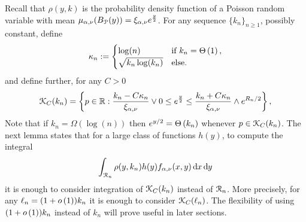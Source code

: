 Recall that $\rho(y, k)$ is the probability density function of a Poisson random variable with mean $\mu_{\alpha, \nu}(B_{{\mathcal P}}(y)) = \xi_{\alpha,\nu}e^{\frac{y}{2}}$. 
For any sequence $\{k_n\}_{n \ge 1}$, possibly constant, define
\begin{equation}\label{eq:def_kappa_n}
	\kappa_n := \begin{cases}
		\log(n) &\mbox{if } k_n = \Theta\left(1\right),\\
		\sqrt{k_n \log(k_n)} &\mbox{else.}
	\end{cases}
\end{equation}
and define further, for any $C > 0$
\begin{equation}\label{eq:def_K_C_set}
	{\mathcal K}_C(k_n) = \left\{p \in {\ensuremath{\mathbb R}} : \frac{k_n - C \kappa_n}{\xi_{\alpha,\nu}} \vee 0 \le e^{\frac{y}{2}}
	\le \frac{k_n + C \kappa_n}{\xi_{\alpha,\nu}} \wedge e^{R_n/2} \right\},
\end{equation}
Note that if $k_n = \Omega(\log(n))$ then $e^{y/2} = \Theta\left(k_n\right)$ whenever $p \in {\mathcal K}_C(k_n)$. The next lemma states that for a large class of functions $h(y)$, to compute the integral 
\[
	\int_{{\mathcal R}_n} \rho(y,k_n) h(y) f_{\alpha,\nu}(x,y) \operatorname{\mathrm{d}\hspace{-2pt}} x \operatorname{\mathrm{d}\hspace{-2pt}} y
\]
it is enough to consider integration of ${\mathcal K}_C(k_n)$ instead of ${\mathcal R}_n$. More precisely, for any $\ell_n = (1 + o\left(1\right))k_n$ it is enough to consider ${\mathcal K}_C(\ell_n)$. The flexibility of using $(1+o\left(1\right))k_n$ instead of $k_n$ will prove useful in later sections.

